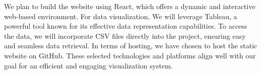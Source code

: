 \documentclass{article}
\begin{document}
\vspace{5mm} %

We plan to build the website using React, which offers a dynamic and interactive 
web-based environment. For data visualization, We will leverage Tableau, 
a powerful tool known for its effective data representation capabilities. 
To access the data, we will incorporate CSV files directly into the project, 
ensuring easy and seamless data retrieval. 
In terms of hosting, we have chosen to host the static website on GitHub.
These selected technologies and platforms align well with our goal 
for an efficient and engaging visualization system.
\end{document}
